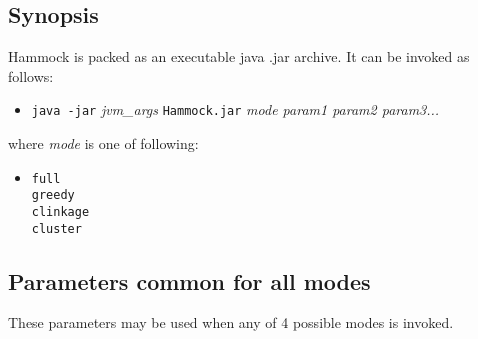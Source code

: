 \documentclass[11pt, a4paper, twoside, titlepage]{article}
\begin{document}
\subsection{Synopsis}

Hammock is packed as an executable java .jar archive. It can be invoked as follows:
\begin{itemize}
	\item[]\verb|java -jar| \textit{jvm\_args} \verb|Hammock.jar| \textit{mode param1 param2 param3...}
\end{itemize}
where \textit{mode} is one of following: 
\begin{itemize}
	\item[] \verb|full|\\
			 \verb|greedy|\\
			 \verb|clinkage|\\
			 \verb|cluster|\\
\end{itemize}

\subsection{Parameters common for all modes}
\label{parametersCommon}
These parameters may be used when any of 4 possible modes is invoked. 

\renewcommand{\ttdefault}{pcr}
\end{document}
